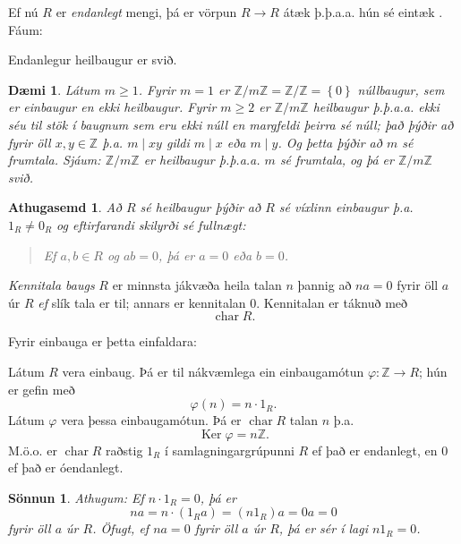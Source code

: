 \documentclass[a4paper,icelandic,11pt]{book}
\theoremstyle{plain}
\newtheorem{daemi}{Dæmi}[chapter]
\newtheorem*{ath}{Athugasemd}
\newtheorem*{sonnun}{Sönnun}
\newcommand{\Z}{\mathbb{Z}}
\DeclareMathOperator{\Ker}{Ker} %
\DeclareMathOperator{\kennitala}{char} %
\begin{document}
Ef nú $R$ er \emph{endanlegt} mengi, þá er vörpun $R\to R$ átæk
þ.þ.a.a. hún sé eintæk . Fáum:
\begin{setn}
  Endanlegur heilbaugur er svið.
\end{setn}
\begin{daemi}
  Látum $m\geq 1$. Fyrir $m = 1$ er $\Z/m\Z = \Z/\Z = \left\{ 0 \right\}$
  núllbaugur, sem er einbaugur en ekki heilbaugur. Fyrir $m\geq 2$ er
  $\Z/m\Z$ heilbaugur þ.þ.a.a. ekki séu til stök í baugnum sem eru ekki núll 
  en margfeldi þeirra sé núll; það þýðir að fyrir öll $x,y\in \Z$ þ.a.
  $m \mid xy$ gildi $m\mid x$ eða $m\mid y$. Og þetta þýðir að $m$ sé frumtala. Sjáum:
  $\Z/m\Z$ er heilbaugur þ.þ.a.a. $m$ sé frumtala, og þá er $\Z/m\Z$
  \emph{svið}.
\end{daemi}
\begin{ath}
  Að $R$ sé heilbaugur þýðir að $R$ sé víxlinn einbaugur þ.a. $1_R\neq 0_R$ og
  eftirfarandi skilyrði sé fullnægt:
  \begin{quote}
    Ef $a,b\in R$ og $ab = 0$, þá er $a = 0$ eða $b = 0$.
  \end{quote}
\end{ath}
\begin{skilgr}
  \emph{Kennitala baugs} $R$ er minnsta
  jákvæða heila talan $n$ þannig að $na = 0$ fyrir öll $a$ úr $R$ \emph{ef} slík
  tala er til; annars er kennitalan $0$. Kennitalan er táknuð með 
  \[
    \kennitala R.
  \]
\end{skilgr}
Fyrir einbauga er þetta einfaldara:
\begin{setn}
  Látum $R$ vera einbaug. Þá er til nákvæmlega ein einbaugamótun 
  $\varphi: \Z \to R$; hún er gefin með 
  \[
    \varphi(n) = n\cdot 1_R.
  \]
  Látum $\varphi$ vera þessa einbaugamótun. Þá er $\kennitala R$ talan $n$ þ.a.
  \[
    \Ker\varphi = n\Z.
  \]
  M.ö.o. er $\kennitala R$ raðstig $1_R$ í samlagningargrúpunni $R$ ef það er
  endanlegt, en $0$ ef það er óendanlegt.
\end{setn}
\begin{sonnun}
  Athugum: Ef $n\cdot 1_R = 0$, þá er
  \[
    na 
    = n\cdot (1_R a) 
    = (n1_R)a 
    = 0a
    = 0
  \]
  fyrir öll $a$ úr $R$. Öfugt, ef $na = 0$ fyrir öll $a$ úr $R$, þá er sér í
  lagi $n 1_R = 0$.
\end{sonnun}

\end{document}

